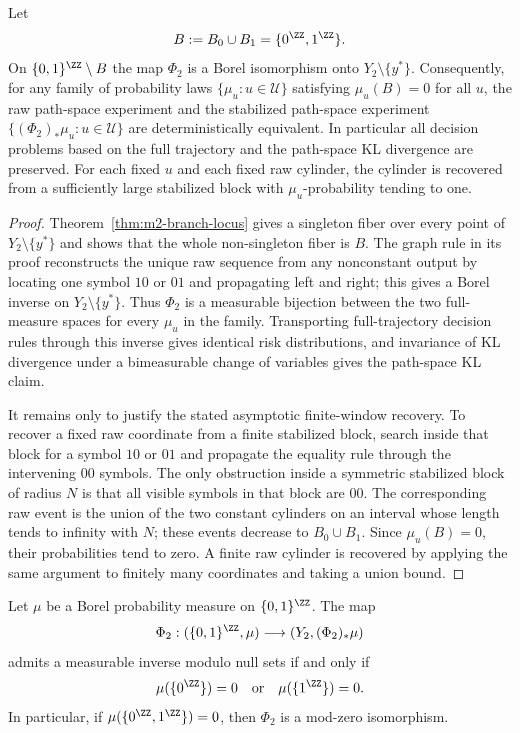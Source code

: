 \begin{corollary}\label{cor:m2-asymptotic-sufficiency}
Let
\[
B:=B_0\cup B_1=\{0^{\ZZ},1^{\ZZ}\}.
\]
On $\{0,1\}^{\ZZ}\setminus B$ the map $\Phi_2$ is a Borel isomorphism onto
$Y_2\setminus\{y^\ast\}$.  Consequently, for any family of probability laws
$\{\mu_u:u\in\mathcal U\}$ satisfying $\mu_u(B)=0$ for all $u$, the raw
path-space experiment and the stabilized path-space experiment
$\{(\Phi_2)_*\mu_u:u\in\mathcal U\}$ are deterministically equivalent.  In
particular all decision problems based on the full trajectory and the
path-space KL divergence are preserved.  For each fixed $u$ and each fixed
raw cylinder, the cylinder is recovered from a sufficiently large stabilized
block with $\mu_u$-probability tending to one.
\end{corollary}

\begin{proof}
Theorem~\ref{thm:m2-branch-locus} gives a singleton fiber over every point of
$Y_2\setminus\{y^\ast\}$ and shows that the whole non-singleton fiber is $B$.
The graph rule in its proof reconstructs the unique raw sequence from any
nonconstant output by locating one symbol $10$ or $01$ and propagating left and
right; this gives a Borel inverse on $Y_2\setminus\{y^\ast\}$.  Thus $\Phi_2$
is a measurable bijection between the two full-measure spaces for every
$\mu_u$ in the family.  Transporting full-trajectory decision rules through
this inverse gives identical risk distributions, and invariance of KL
divergence under a bimeasurable change of variables gives the path-space KL
claim.

It remains only to justify the stated asymptotic finite-window recovery.  To
recover a fixed raw coordinate from a finite stabilized block, search inside
that block for a symbol $10$ or $01$ and propagate the equality rule through
the intervening $00$ symbols.  The only obstruction inside a symmetric
stabilized block of radius $N$ is that all visible symbols in that block are
$00$.  The corresponding raw event is the union of the two constant cylinders
on an interval whose length tends to infinity with $N$; these events decrease
to $B_0\cup B_1$.  Since $\mu_u(B)=0$, their probabilities tend to zero.  A
finite raw cylinder is recovered by applying the same argument to finitely
many coordinates and taking a union bound.
\end{proof}

\begin{corollary}\label{cor:m2-mod-zero}
Let $\mu$ be a Borel probability measure on $\{0,1\}^{\ZZ}$.  The map
\[
\Phi_2:(\{0,1\}^{\ZZ},\mu)\longrightarrow(Y_2,(\Phi_2)_*\mu)
\]
admits a measurable inverse modulo null sets if and only if
\[
\mu(\{0^{\ZZ}\})=0\quad\text{or}\quad \mu(\{1^{\ZZ}\})=0.
\]
In particular, if $\mu(\{0^{\ZZ},1^{\ZZ}\})=0$, then $\Phi_2$ is a mod-zero
isomorphism.
\end{corollary}

